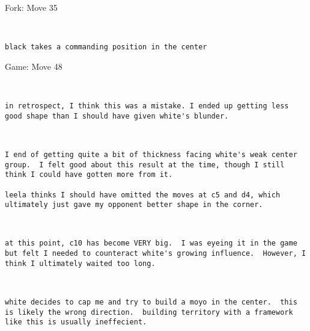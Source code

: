 \documentclass{article}
\begin{document}
\begin{subsection}{Fork: Move 35}
\begin{center}
\cleargoban
{}
\showfullgoban
\\\begin{lstlisting}
black takes a commanding position in the center
\end{lstlisting}
\end{center}
\end{subsection}
\newpage
\begin{section}{Game: Move 48}
\begin{center}
\cleargoban
{}
\showfullgoban
\\\begin{lstlisting}
in retrospect, I think this was a mistake. I ended up getting less good shape than I should have given white's blunder. 
\end{lstlisting}
\end{center}
\begin{center}
\cleargoban
{}
\showfullgoban
\\\begin{lstlisting}
I end of getting quite a bit of thickness facing white's weak center group.  I felt good about this result at the time, though I still think I could have gotten more from it. 

leela thinks I should have omitted the moves at c5 and d4, which ultimately just gave my opponent better shape in the corner. 
\end{lstlisting}
\end{center}
\begin{center}
\cleargoban
{}
\showfullgoban
\\\begin{lstlisting}
at this point, c10 has become VERY big.  I was eyeing it in the game but felt I needed to counteract white's growing influence.  However, I think I ultimately waited too long. 
\end{lstlisting}
\end{center}
\begin{center}
\cleargoban
{}
\showfullgoban
\\\begin{lstlisting}
white decides to cap me and try to build a moyo in the center.  this is likely the wrong direction.  building territory with a framework like this is usually ineffecient.  


\end{lstlisting}
\end{center}
\end{section}
\end{document}
